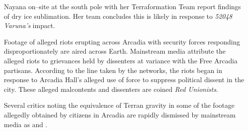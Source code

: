 Nayana on--site at the south pole with her Terraformation Team report findings of dry ice sublimation. Her team concludes this is likely in response to {\it 52048 Varuna's} impact.
\StopTimelineDate

Footage of alleged riots erupting across Arcadia with security forces responding disproportionately are aired across Earth. Mainstream media attribute the alleged riots to grievances held by dissenters at variance with the Free Arcadia partisans. According to the line taken by the networks, the riots began in response to Arcadia Hall's alleged use of force to suppress political dissent in the city. These alleged malcontents and dissenters are coined {\it Red Unionists}. 

Several critics noting the equivalence of Terran gravity in some of the footage allegedly obtained by citizens in Arcadia are rapidly dismissed by mainstream media as  and .
\StopTimelineDate

